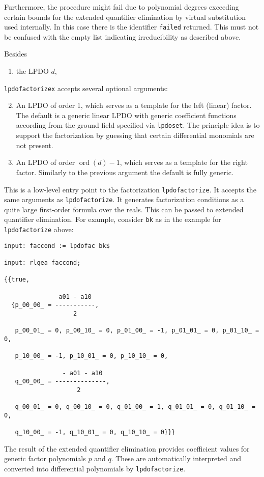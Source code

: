 Furthermore, the procedure might fail due to polynomial degrees
exceeding certain bounds for the extended quantifier elimination by
virtual substitution used internally. In this case there is the
identifier \texttt{failed} returned. This must not be confused with the
empty list indicating irreducibility as described above.

Besides
\begin{enumerate}
\item the LPDO $d$,
\end{enumerate}
\texttt{lpdofactorizex} accepts several optional arguments:
\begin{enumerate}
\setcounter{enumi}{1}
\item An LPDO of order 1, which serves as a template for the left
  (linear) factor. The default is a generic linear LPDO with generic
  coefficient functions according from the ground field specified via
  \texttt{lpdoset}. The principle idea is to support the factorization
  by guessing that certain differential monomials are not present.
\item An LPDO of order $\operatorname{ord}(d)-1$, which serves as a
  template for the right factor. Similarly to the previous argument the
  default is fully generic.
\end{enumerate}

This is a low-level entry point to the factorization
\texttt{lpdofactorize}. It accepts the same arguments as
\texttt{lpdofactorize}. It generates factorization conditions as a quite
large first-order formula over the reals. This can be passed to extended
quantifier elimination. For example, consider \texttt{bk} as in the
example for \texttt{lpdofactorize} above:

{\samepage
\begin{footnotesize}
\begin{verbatim}
input: faccond := lpdofac bk$

input: rlqea faccond;

{{true,

               a01 - a10
  {p_00_00_ = -----------,
                   2

   p_00_01_ = 0, p_00_10_ = 0, p_01_00_ = -1, p_01_01_ = 0, p_01_10_ = 0,

   p_10_00_ = -1, p_10_01_ = 0, p_10_10_ = 0,

                - a01 - a10
   q_00_00_ = --------------,
                    2

   q_00_01_ = 0, q_00_10_ = 0, q_01_00_ = 1, q_01_01_ = 0, q_01_10_ = 0,

   q_10_00_ = -1, q_10_01_ = 0, q_10_10_ = 0}}}
\end{verbatim}
\end{footnotesize}
}
The result of the extended quantifier elimination provides coefficient
values for generic factor polynomials $p$ and $q$. These are
automatically interpreted and converted into differential polynomials
by \texttt{lpdofactorize}.

